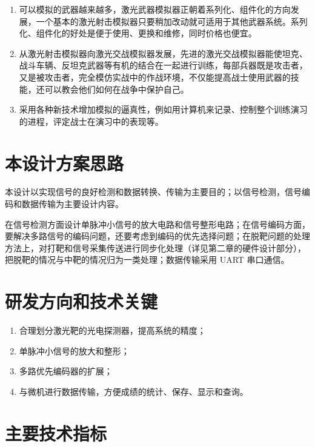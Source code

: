 \begin{enumerate}
  \item 可以模拟的武器越来越多，激光武器模拟器正朝着系列化、组件化的方向发展，一个基本的激光射击模拟器只要稍加改动就可适用于其他武器系统。系列化、组件化的好处是便于使用、更换和维修，同时价格也便宜。
  \item 从激光射击模拟器向激光交战模拟器发展，先进的激光交战模拟器能使坦克、战斗车辆、反坦克武器等有机的结合在一起进行训练，每部兵器既是攻击者，又是被攻击者，完全模仿实战中的作战环境，不仅能提高战士使用武器的技能，还可以教会他们如何在战争中保护自己。
  \item 采用各种新技术增加模拟的逼真性，例如用计算机来记录、控制整个训练演习的进程，评定战士在演习中的表现等。
\end{enumerate}

\section{本设计方案思路}

本设计以实现信号的良好检测和数据转换、传输为主要目的；以信号检测，信号编码和数据传输为主要设计内容。

在信号检测方面设计单脉冲小信号的放大电路和信号整形电路；在信号编码方面，要解决多路信号的编码问题，还要考虑到编码的优先选择问题；在脱靶问题的处理方法上，对打靶和信号采集传送进行同步化处理（详见第二章的硬件设计部分），把脱靶的情况与中靶的情况归为一类处理；数据传输采用 UART 串口通信。

\section{研发方向和技术关键}

\begin{enumerate}
  \item 合理划分激光靶的光电探测器，提高系统的精度；
  \item 单脉冲小信号的放大和整形；
  \item 多路优先编码器的扩展；
  \item 与微机进行数据传输，方便成绩的统计、保存、显示和查询。
\end{enumerate}

\section{主要技术指标}


